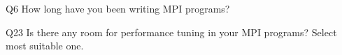 \begin{description}%
\item{Q6} How long have you been writing MPI programs?%
\item{Q23} Is there any room for performance tuning in your MPI programs? Select most suitable one.%
\end{description}%
